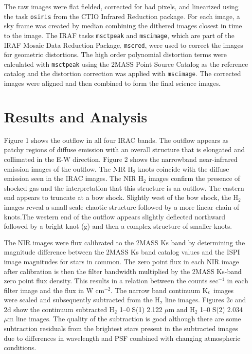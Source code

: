 \documentclass[iop]{emulateapj}
\begin{document}
The raw images were flat fielded, corrected for bad pixels, and
linearized using the task {\tt{osiris}} from the CTIO Infrared
Reduction package. For each image, a sky frame was created by median
combining the dithered images closest in time to the image. 
The IRAF tasks {\tt{msctpeak}}
and {\tt{mscimage}}, which are part of the IRAF Mosaic Data Reduction
Package, {\tt{mscred}}, were used to correct the images for geometric
distortions. The high order polynomial distortion terms were
calculated with {\tt{msctpeak}} using the 2MASS Point Source Catalog
as the reference catalog and the distortion correction was applied
with {\tt{mscimage}}. The corrected images were aligned and then
combined to form the final science images.

\section{Results and Analysis}

Figure 1 shows the outflow in all four IRAC bands.  
The outflow appears as patchy regions of diffuse emission with an overall structure
that is elongated and collimated in the E-W direction.
Figure 2 shows the narrowband near-infrared emission images of the outflow. 
The NIR H$_2$ knots coincide with the diffuse emission seen in the
IRAC images.  The NIR H$_2$ images confirm the presence of shocked gas
and the interpretation that this structure is an outflow.
The eastern end appears to truncate at a bow shock. Slightly west
of the  bow shock, the H$_2$ images reveal a small scale chaotic structure followed
by a more linear chain of knots.The western end of the outflow appears slightly deflected 
northward followed by a bright knot (g) and then a complex structure of smaller knots.


The NIR images were flux calibrated to the 2MASS Ks band by
determining the magnitude difference between the 2MASS Ks band
catalog values and the ISPI image magnitudes for stars in common.
The zero point flux in  
each NIR image after calibration is then the filter bandwidth multiplied by
the 2MASS Ks-band zero point flux density. This results in a relation between
the counts sec$^{-1}$ in each filter image and the flux in W cm$^{-2}$.
The narrow band continuum K$_{\rm{c}}$ images were scaled and subsequently
subtracted from
the H$_2$ line images. Figures 2c and 2d show the continuum subtracted
H$_2$ 1--0 S(1) 2.122 $\mu$m and H$_2$ 1--0 S(2) 2.034 $\mu$m line
images.  The quality of the subtraction is good although there are some
subtraction residuals from the brightest stars present in the subtracted images due
to differences in wavelength and PSF combined with changing
atmospheric conditions.
\end{document}

